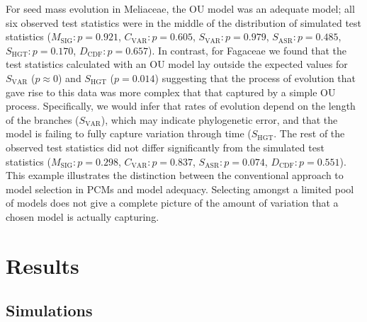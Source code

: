For seed mass evolution in Meliaceae, the OU model was an adequate model; all six observed test statistics were in the middle of the distribution of simulated test statistics ($M_{\text{SIG}}: p=0.921$, $C_{\text{VAR}}: p=0.605$, $S_{\text{VAR}}: p=0.979$, $S_{\text{ASR}}:p=0.485$, $S_{\text{HGT}}: p=0.170$, $D_{\text{CDF}}: p=0.657$). In contrast, for Fagaceae we found that the test statistics calculated with an OU model lay outside the expected values for $S_{\text{VAR}}$ ($p \approx 0$) and $S_{\text{HGT}}$ ($p = 0.014$) suggesting that the process of evolution that gave rise to this data was more complex that that captured by a simple OU process. Specifically, we would infer that rates of evolution depend on the length of the branches ($S_{\text{VAR}}$), which may indicate phylogenetic error, and that the model is failing to fully capture variation through time ($S_{\text{HGT}}$. The rest of the observed test statistics did not differ significantly from the simulated test statistics ($M_{\text{SIG}}: p=0.298$, $C_{\text{VAR}}:p=0.837$, $S_{\text{ASR}}:p=0.074$, $D_{\text{CDF}}: p=0.551$). This example illustrates the distinction between the conventional approach to model selection in PCMs and model adequacy. Selecting amongst a limited pool of models does not give a complete picture of the amount of variation that a chosen model is actually capturing.


\section{Results}

\subsection{Simulations}

